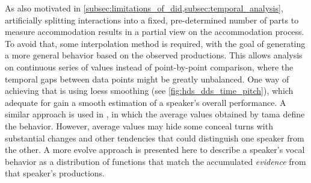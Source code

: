 As also motivated in \cref{subsec:limitations_of_did,subsec:temporal_analysis}, artificially splitting interactions into a fixed, pre-determined number of parts to measure accommodation results in a partial view on the accommodation process.
To avoid that, some interpolation method is required, with the goal of generating a more general behavior based on the observed productions.
This allows analysis on continuous series of values instead of point-by-point comparison, where the temporal gaps between data points might be greatly unbalanced.
One way of achieving that is using \ac{loess} smoothing (see \cref{fig:hds_dds_time_pitch}), which adequate for gain a smooth estimation of a speaker's overall performance.
A similar approach is used in \citet{Galvez2020unifiying}, in which the average values obtained by \acl{tama} \citep[\acs{tama};][]{Kousidis2008towards, Kousidis2009monitoring} define the behavior.
However, average values may hide some conceal turns with substantial changes and other tendencies that could distinguish one speaker from the other.
A more evolve approach is presented here to describe a speaker's vocal behavior as a distribution of functions that match the accumulated \textit{evidence} from that speaker's productions.

